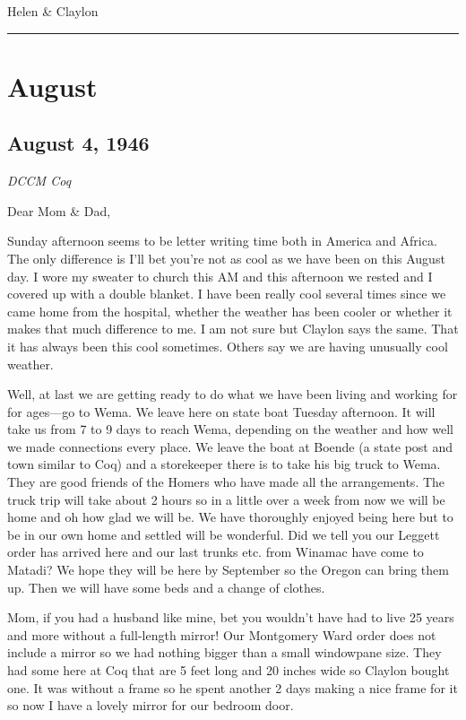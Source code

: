 \documentclass[
]{book}
\begin{document}
Helen \& Claylon

\begin{center}\rule{0.5\linewidth}{0.5pt}\end{center}

\hypertarget{august}{%
\section{August}\label{august}}

\hypertarget{august-4-1946}{%
\subsection{August 4, 1946}\label{august-4-1946}}

\emph{DCCM Coq}

Dear Mom \& Dad,

Sunday afternoon seems to be letter writing time both in America and Africa. The only difference is I'll bet you're not as cool as we have been on this August day. I wore my sweater to church this AM and this afternoon we rested and I covered up with a double blanket. I have been really cool several times since we came home from the hospital, whether the weather has been cooler or whether it makes that much difference to me. I am not sure but Claylon says the same. That it has always been this cool sometimes. Others say we are having unusually cool weather.

Well, at last we are getting ready to do what we have been living and working for for ages---go to Wema. We leave here on state boat Tuesday afternoon. It will take us from 7 to 9 days to reach Wema, depending on the weather and how well we made connections every place. We leave the boat at Boende (a state post and town similar to Coq) and a storekeeper there is to take his big truck to Wema. They are good friends of the Homers who have made all the arrangements. The truck trip will take about 2 hours so in a little over a week from now we will be home and oh how glad we will be. We have thoroughly enjoyed being here but to be in our own home and settled will be wonderful. Did we tell you our Leggett order has arrived here and our last trunks etc. from Winamac have come to Matadi? We hope they will be here by September so the Oregon can bring them up. Then we will have some beds and a change of clothes.

Mom, if you had a husband like mine, bet you wouldn't have had to live 25 years and more without a full-length mirror! Our Montgomery Ward order does not include a mirror so we had nothing bigger than a small windowpane size. They had some here at Coq that are 5 feet long and 20 inches wide so Claylon bought one. It was without a frame so he spent another 2 days making a nice frame for it so now I have a lovely mirror for our bedroom door.
\end{document}
